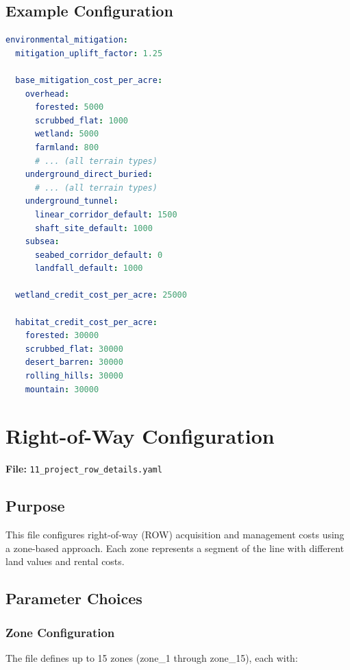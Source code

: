 \documentclass[ctcc_full_documentation.tex]{subfiles}
\begin{document}
\subsection{Example Configuration}

\begin{lstlisting}[language=yaml]
environmental_mitigation:
  mitigation_uplift_factor: 1.25

  base_mitigation_cost_per_acre:
    overhead:
      forested: 5000
      scrubbed_flat: 1000
      wetland: 5000
      farmland: 800
      # ... (all terrain types)
    underground_direct_buried:
      # ... (all terrain types)
    underground_tunnel:
      linear_corridor_default: 1500
      shaft_site_default: 1000
    subsea:
      seabed_corridor_default: 0
      landfall_default: 1000

  wetland_credit_cost_per_acre: 25000

  habitat_credit_cost_per_acre:
    forested: 30000
    scrubbed_flat: 30000
    desert_barren: 30000
    rolling_hills: 30000
    mountain: 30000
\end{lstlisting}

\section{Right-of-Way Configuration}
\label{sec:row}

\textbf{File:} \texttt{11\_project\_row\_details.yaml}

\subsection{Purpose}

This file configures right-of-way (ROW) acquisition and management costs using a zone-based approach. Each zone represents a segment of the line with different land values and rental costs.

\subsection{Parameter Choices}

\subsubsection{Zone Configuration}

The file defines up to 15 zones (zone\_1 through zone\_15), each with:
\end{document}
